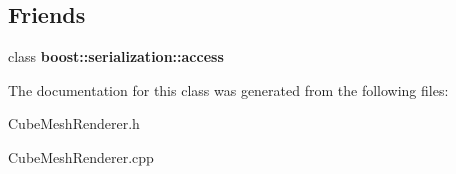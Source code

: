 \subsection*{Friends}
\begin{DoxyCompactItemize}
\item 
\hypertarget{class_cube_mesh_renderer_ac98d07dd8f7b70e16ccb9a01abf56b9c}{
class {\bfseries boost::serialization::access}}
\label{class_cube_mesh_renderer_ac98d07dd8f7b70e16ccb9a01abf56b9c}

\end{DoxyCompactItemize}


The documentation for this class was generated from the following files:\begin{DoxyCompactItemize}
\item 
CubeMeshRenderer.h\item 
CubeMeshRenderer.cpp\end{DoxyCompactItemize}
